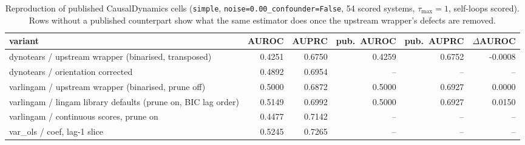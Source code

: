 
\begin{table}[t]\centering\small
\caption{Reproduction of published CausalDynamics cells (\texttt{simple}, \texttt{noise=0.00\_confounder=False}, 54 scored systems, $\tau_{\max}=1$, self-loops scored). Rows without a published counterpart show what the same estimator does once the upstream wrapper's defects are removed.}
\label{tab:bench-dynamics-calibration}
\begin{tabular}{lrrrrr}\toprule
variant & AUROC & AUPRC & pub.\ AUROC & pub.\ AUPRC & $\Delta$AUROC\\\midrule
dynotears / upstream wrapper (binarised, transposed) & 0.4251 & 0.6750 & 0.4259 & 0.6752 & -0.0008 \\
dynotears / orientation corrected & 0.4892 & 0.6954 & -- & -- & -- \\
varlingam / upstream wrapper (binarised, prune off) & 0.5000 & 0.6872 & 0.5000 & 0.6927 & 0.0000 \\
varlingam / lingam library defaults (prune on, BIC lag order) & 0.5149 & 0.6992 & 0.5000 & 0.6927 & 0.0150 \\
varlingam / continuous scores, prune on & 0.4477 & 0.7142 & -- & -- & -- \\
var\_ols / \textbar{}coef\textbar{}, lag-1 slice & 0.5245 & 0.7265 & -- & -- & -- \\
\bottomrule\end{tabular}\end{table}

